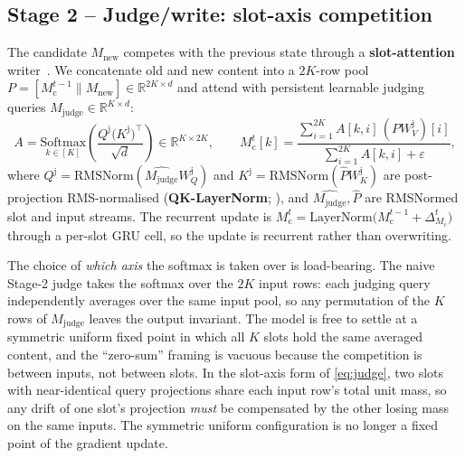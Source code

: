 \documentclass[11pt]{article}
\newcommand{\Mc}{M_{\mathrm{c}}}
\newcommand{\Mj}{M_{\mathrm{judge}}}
\newcommand{\Mnew}{M_{\mathrm{new}}}
\begin{document}
\subsection{Stage 2 -- Judge/write: slot-axis competition}
\label{sec:judge}

The candidate $\Mnew$ competes with the previous state through a
\textbf{slot-attention} writer~\citep{locatello2020slot}. We
concatenate old and new content into a $2K$-row pool
$P = [\Mc^{t-1} \parallel \Mnew] \in \mathbb{R}^{2K \times d}$ and
attend with persistent learnable judging queries
$\Mj \in \mathbb{R}^{K \times d}$:
\begin{equation}
A = \underset{k \in [K]}{\mathrm{Softmax}}\!\left(
  \frac{Q^{\mathrm{j}} \bigl(K^{\mathrm{j}}\bigr)^\top}{\sqrt{d}}
  \right) \in \mathbb{R}^{K \times 2K},
  \qquad
  \Mc^{t}[k] = \frac{\sum_{i=1}^{2K} A[k,i] \,(P W_V^{\mathrm{j}})[i]}
                    {\sum_{i=1}^{2K} A[k,i] + \varepsilon},
\label{eq:judge}
\end{equation}
where $Q^{\mathrm{j}} = \mathrm{RMSNorm}(\hat{\Mj} W_Q^{\mathrm{j}})$
and $K^{\mathrm{j}} = \mathrm{RMSNorm}(\hat{P} W_K^{\mathrm{j}})$ are
post-projection RMS-normalised (\textbf{QK-LayerNorm};
\citealt{zhai2023sigmareparam}), and $\hat{\Mj}, \hat{P}$ are
RMSNormed slot and input streams. The recurrent update is
$\Mc^{t} = \mathrm{LayerNorm}\bigl(\Mc^{t-1} + \Delta_{\Mc}^{t}\bigr)$
through a per-slot GRU cell, so the update is recurrent rather than
overwriting.

The choice of \emph{which axis} the softmax is taken over is
load-bearing. The naive Stage-2 judge takes the softmax over the $2K$
input rows: each judging query independently averages over the same
input pool, so any permutation of the $K$ rows of $\Mj$ leaves the
output invariant. The model is free to settle at a symmetric uniform
fixed point in which all $K$ slots hold the same averaged content,
and the ``zero-sum'' framing is vacuous because the competition is
between inputs, not between slots. In the slot-axis form of
\eqref{eq:judge}, two slots with near-identical query projections
share each input row's total unit mass, so any drift of one slot's
projection \emph{must} be compensated by the other losing mass on
the same inputs. The symmetric uniform configuration is no longer a
fixed point of the gradient update.
\end{document}
